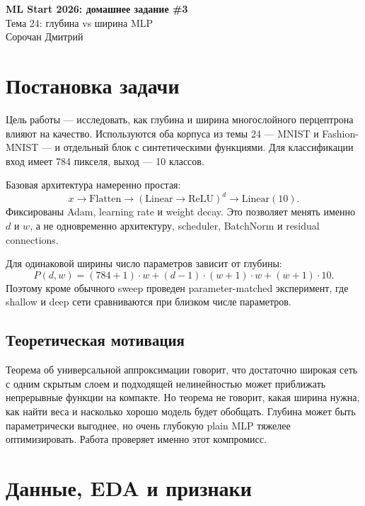 \documentclass[11pt,a4paper]{extarticle}
\begin{document}
\begin{center}
{\LARGE\bfseries ML Start 2026: домашнее задание \#3}\\[2mm]
{\Large Тема 24: глубина vs ширина MLP}\\[1mm]
{\normalsize Сорочан Дмитрий}
\end{center}

\section{Постановка задачи}

\hspace*{11mm}Цель работы --- исследовать, как глубина и ширина многослойного перцептрона влияют на качество. Используются оба корпуса из темы 24 --- MNIST и Fashion-MNIST --- и отдельный блок с синтетическими функциями. Для классификации вход имеет 784 пикселя, выход --- 10 классов.

Базовая архитектура намеренно простая:
$$
  x 
  \to \mathrm{Flatten} 
  \to (\mathrm{Linear}
  \to\mathrm{ReLU})^d 
  \to \mathrm{Linear}(10).
$$
Фиксированы Adam, learning rate и weight decay. Это позволяет менять именно $d$ и $w$, а не одновременно архитектуру, scheduler, BatchNorm и residual connections.

Для одинаковой ширины число параметров зависит от глубины:
$$
    P(d, w)
    = (784 + 1) \cdot w + (d - 1) \cdot (w + 1) \cdot w + (w + 1) \cdot 10.
$$
Поэтому кроме обычного sweep проведен parameter-matched эксперимент, где shallow и deep сети сравниваются при близком числе параметров.

\subsection{Теоретическая мотивация}

\hspace*{11mm}Теорема об универсальной аппроксимации говорит, что достаточно широкая сеть с одним скрытым слоем и подходящей нелинейностью может приближать непрерывные функции на компакте. Но теорема не говорит, какая ширина нужна, как найти веса и насколько хорошо модель будет обобщать. Глубина может быть параметрически выгоднее, но очень глубокую plain MLP тяжелее оптимизировать. Работа проверяет именно этот компромисс.

\section{Данные, EDA и признаки}
\end{document}
